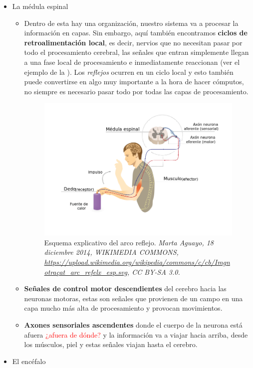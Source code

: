 \begin{itemize}
 \item La médula espinal
    \begin{itemize}
     \item Dentro de esta hay una organización, nuestro sistema va a procesar la información en capas.  Sin embargo, aquí también encontramos \textbf{ciclos de retroalimentación local}, es decir, nervios que no necesitan pasar por todo el procesamiento cerebral, las señales que entran simplemente llegan a una fase local de procesamiento e inmediatamente reaccionan (ver el ejemplo de la ). Los \emph{reflejos} ocurren en un ciclo local y esto también puede convertirse en algo muy importante a la hora de hacer cómputos, no siempre es necesario pasar todo por todas las capas de procesamiento. 


     \begin{figure}[h]
      \centering
      \includegraphics[scale=0.4]{../Figuras/actReflejo.png}
      \caption{ Esquema explicativo del arco reflejo.  \textit{Marta Aguayo, 18 diciembre 2014, WIKIMEDIA COMMONS, \url{https://upload.wikimedia.org/wikipedia/commons/c/cb/Imgnotraçat_arc_refelx_esp.svg}, CC BY-SA 3.0.}}
      \label{actReflejo}
     \end{figure}


     \item \textbf{Señales de control motor descendientes} del cerebro hacia las neuronas motoras, estas son señales que provienen de un campo en una capa mucho más alta de procesamiento y provocan movimientos.
     
     \item \textbf{Axones sensoriales ascendentes} donde el cuerpo de la neurona está afuera \textcolor{red}{¿afuera de dónde?} y la información va a viajar hacia arriba, desde los músculos, piel y  estas señales viajan hasta el cerebro.  


     \end{itemize}


 \item El encéfalo
\end{itemize}


